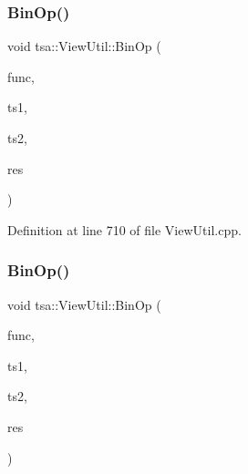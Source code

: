 \mbox{\label{classtsa_1_1_view_util_ab0581113b72809931eecd046aade4bba}} 
\subsubsection{\texorpdfstring{Bin\+Op()}{BinOp()}\hspace{0.1cm}{\footnotesize\ttfamily [1/2]}}
{\footnotesize\ttfamily void tsa\+::\+View\+Util\+::\+Bin\+Op (\begin{DoxyParamCaption}\item[{std\+::complex$<$ double $>$($\ast$)(std\+::complex$<$ double $>$, std\+::complex$<$ double $>$)}]{func,  }\item[{\hyperlink{namespacetsa_ab32775c889b53c40fa83939f22372b75}{Seq\+View\+Complex} \&}]{ts1,  }\item[{\hyperlink{namespacetsa_ab32775c889b53c40fa83939f22372b75}{Seq\+View\+Complex} \&}]{ts2,  }\item[{\hyperlink{namespacetsa_ab32775c889b53c40fa83939f22372b75}{Seq\+View\+Complex} \&}]{res }\end{DoxyParamCaption})\hspace{0.3cm}{\ttfamily [static]}}



Definition at line 710 of file View\+Util.\+cpp.

\mbox{\label{classtsa_1_1_view_util_af8b92069d5fa30c169f4dcb34e675972}} 
\subsubsection{\texorpdfstring{Bin\+Op()}{BinOp()}\hspace{0.1cm}{\footnotesize\ttfamily [2/2]}}
{\footnotesize\ttfamily void tsa\+::\+View\+Util\+::\+Bin\+Op (\begin{DoxyParamCaption}\item[{double($\ast$)(double, double)}]{func,  }\item[{\hyperlink{namespacetsa_ac599574bcc094eda25613724b8f3ca9e}{Seq\+View\+Double} \&}]{ts1,  }\item[{\hyperlink{namespacetsa_ac599574bcc094eda25613724b8f3ca9e}{Seq\+View\+Double} \&}]{ts2,  }\item[{\hyperlink{namespacetsa_ac599574bcc094eda25613724b8f3ca9e}{Seq\+View\+Double} \&}]{res }\end{DoxyParamCaption})\hspace{0.3cm}{\ttfamily [static]}}



